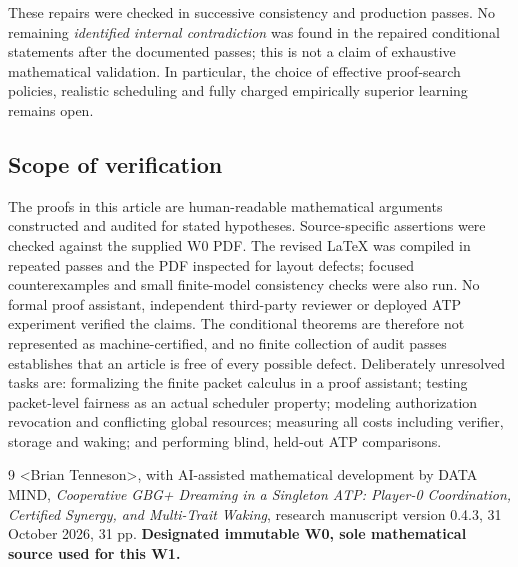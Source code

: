 \documentclass[11pt,letterpaper]{article}
\begin{document}
\noindent These repairs were checked in successive consistency and production passes. No remaining \emph{identified internal contradiction} was found in the repaired conditional statements after the documented passes; this is not a claim of exhaustive mathematical validation. In particular, the choice of effective proof-search policies, realistic scheduling and fully charged empirically superior learning remains open.

\subsection{Scope of verification}
The proofs in this article are human-readable mathematical arguments constructed and audited for stated hypotheses. Source-specific assertions were checked against the supplied W0 PDF. The revised LaTeX was compiled in repeated passes and the PDF inspected for layout defects; focused counterexamples and small finite-model consistency checks were also run. No formal proof assistant, independent third-party reviewer or deployed ATP experiment verified the claims. The conditional theorems are therefore not represented as machine-certified, and no finite collection of audit passes establishes that an article is free of every possible defect. Deliberately unresolved tasks are: formalizing the finite packet calculus in a proof assistant; testing packet-level fairness as an actual scheduler property; modeling authorization revocation and conflicting global resources; measuring all costs including verifier, storage and waking; and performing blind, held-out ATP comparisons.

\begin{thebibliography}{9}
\textless Brian Tenneson\textgreater, with AI-assisted mathematical development by DATA MIND, \emph{Cooperative GBG+ Dreaming in a Singleton ATP: Player-0 Coordination, Certified Synergy, and Multi-Trait Waking}, research manuscript version 0.4.3, 31 October 2026, 31 pp. \textbf{Designated immutable W0, sole mathematical source used for this W1.}
\end{thebibliography}

\clearpage
\end{document}

